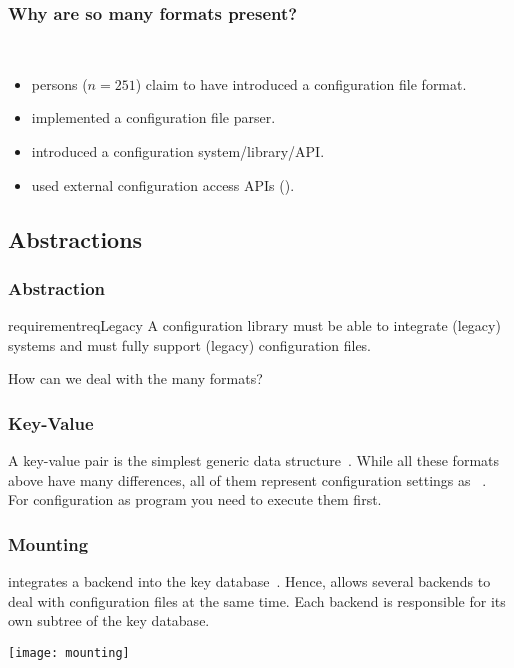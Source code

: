 \documentclass{beamer}
\begin{document}
\begin{frame}
	\frametitle{Why are so many formats present?}
	\methodQuestion{} ~\cite{raab2017challenges}
	\begin{itemize}
	\item {} persons ($n=251$) claim to have introduced a configuration file format.
	\item {} implemented a configuration file parser.
	\item {} introduced a configuration system/library/API.
	\item used external configuration access APIs ().
	\end{itemize}
\end{frame}



\subsection{Abstractions}

\begin{frame}
	\frametitle{Abstraction}
	\begin{restatable}{requirement}{reqLegacy}
	A configuration library must be able to integrate (legacy) systems and must fully support (legacy) configuration files.%
	\label{req:legacy}
	\end{restatable}

	\vspace{1cm}

	How can we deal with the many formats?
\end{frame}


\begin{frame}
	\frametitle{Key-Value}
A key-value pair is the simplest generic data structure~\cite{strang2004context}.
While all these formats above have many differences, all of them represent configuration settings as ~\cite{jin2014configurations,rabkin2011static,xu2013blame,lathia2013open}.
\\[1cm]

For configuration as program you need to execute them first.
\end{frame}

\begin{frame}
	\frametitle{Mounting}
	 integrates a backend into the key database~\cite{raab2008thesis}.
	Hence, \elektra{} allows several backends to deal with configuration files at the same time.
	Each backend is responsible for its own subtree of the key database.

	\texttt{[image: mounting]}
\end{frame}
\end{document}
